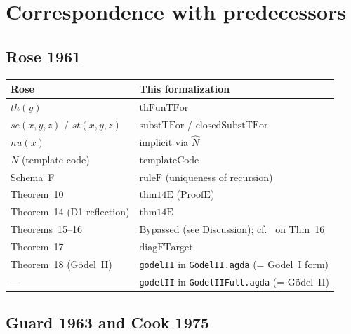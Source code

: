 \documentclass[11pt]{article}
\newcommand{\thFunTFor}{\mathrm{thFunTFor}}
\begin{document}
\section{Correspondence with predecessors}

\subsection*{Rose 1961}

\begin{center}
\begin{tabular}{ll}
\hline
\textbf{Rose~\cite{rose1961}} & \textbf{This formalization} \\
\hline
$th(y)$ & $\thFunTFor$ \\
$se(x,y,z)$ / $st(x,y,z)$ & $\mathrm{substTFor}$ / $\mathrm{closedSubstTFor}$ \\
$nu(x)$ & implicit via $\hat{N}$ \\
$N$ (template code) & $\mathrm{templateCode}$ \\
Schema~F & $\mathrm{ruleF}$ (uniqueness of recursion) \\
Theorem~10 & $\mathrm{thm14E}$ ($\mathrm{ProofE}$) \\
Theorem~14 (D1 reflection) & $\mathrm{thm14E}$ \\
Theorems~15--16 & Bypassed (see Discussion); cf.~\cite{cook1975} on Thm~16 \\
Theorem~17 & $\mathrm{diagFTarget}$ \\
Theorem~18 (G\"odel~II) & \texttt{godelII} in \texttt{GodelII.agda} (= G\"odel~I form) \\
--- & \texttt{godelII} in \texttt{GodelIIFull.agda} (= G\"odel~II) \\
\hline
\end{tabular}
\end{center}

\subsection*{Guard 1963 and Cook 1975}
\end{document}
